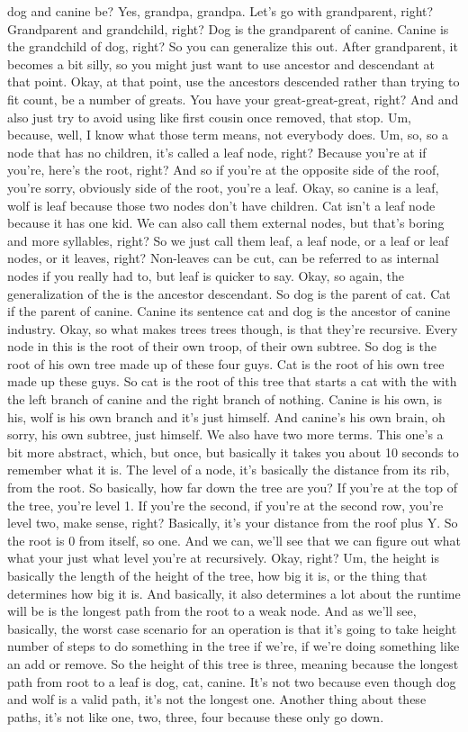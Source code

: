 dog and canine be? Yes, grandpa, grandpa. Let's go with grandparent, right? Grandparent and grandchild, right? Dog is the grandparent of canine. Canine is the grandchild of dog, right? So you can generalize this out. After grandparent, it becomes a bit silly, so you might just want to use ancestor and descendant at that point. Okay, at that point, use the ancestors descended rather than trying to fit count, be a number of greats. You have your great-great-great, right? And and also just try to avoid using like first cousin once removed, that stop. Um, because, well, I know what those term means, not everybody does. Um, so, so a node that has no children, it's called a leaf node, right? Because you're at if you're, here's the root, right? And so if you're at the opposite side of the roof, you're sorry, obviously side of the root, you're a leaf. Okay, so canine is a leaf, wolf is leaf because those two nodes don't have children. Cat isn't a leaf node because it has one kid. We can also call them external nodes, but that's boring and more syllables, right? So we just call them leaf, a leaf node, or a leaf or leaf nodes, or it leaves, right? Non-leaves can be cut, can be referred to as internal nodes if you really had to, but leaf is quicker to say. Okay, so again, the generalization of the is the ancestor descendant. So dog is the parent of cat. Cat if the parent of canine. Canine its sentence cat and dog is the ancestor of canine industry. Okay, so what makes trees trees though, is that they're recursive. Every node in this is the root of their own troop, of their own subtree. So dog is the root of his own tree made up of these four guys. Cat is the root of his own tree made up these guys. So cat is the root of this tree that starts a cat with the with the left branch of canine and the right branch of nothing. Canine is his own, is his, wolf is his own branch and it's just himself. And canine's his own brain, oh sorry, his own subtree, just himself. We also have two more terms. This one's a bit more abstract, which, but once, but basically it takes you about 10 seconds to remember what it is. The level of a node, it's basically the distance from its rib, from the root. So basically, how far down the tree are you? If you're at the top of the tree, you're level 1. If you're the second, if you're at the second row, you're level two, make sense, right? Basically, it's your distance from the roof plus Y. So the root is 0 from itself, so one. And we can, we'll see that we can figure out what what your just what level you're at recursively. Okay, right? Um, the height is basically the length of the height of the tree, how big it is, or the thing that determines how big it is. And basically, it also determines a lot about the runtime will be is the longest path from the root to a weak node. And as we'll see, basically, the worst case scenario for an operation is that it's going to take height number of steps to do something in the tree if we're, if we're doing something like an add or remove. So the height of this tree is three, meaning because the longest path from root to a leaf is dog, cat, canine. It's not two because even though dog and wolf is a valid path, it's not the longest one. Another thing about these paths, it's not like one, two, three, four because these only go down. 